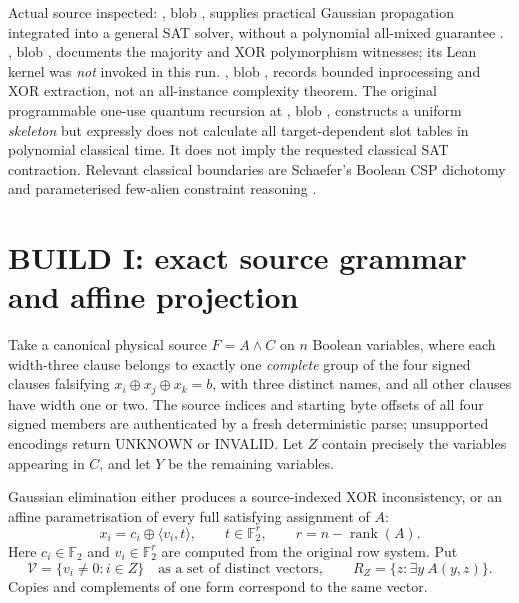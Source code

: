 \documentclass[11pt]{article}
\begin{document}
Actual source inspected:
, blob
\texttt{}, supplies practical
Gaussian propagation integrated into a general SAT solver, without a polynomial
all-mixed guarantee \cite{han2012}.
,
blob \texttt{}, documents the
majority and XOR polymorphism witnesses; its Lean kernel was \emph{not} invoked
in this run. , blob
\texttt{}, records bounded
inprocessing and XOR extraction, not an all-instance complexity theorem.
The original programmable one-use quantum recursion at
,
blob \texttt{}, constructs a
uniform \emph{skeleton} but expressly does not calculate all target-dependent
slot tables in polynomial classical time. It does not imply the requested
classical SAT contraction. Relevant classical boundaries are Schaefer's
Boolean CSP dichotomy \cite{schaefer1978} and parameterised few-alien
constraint reasoning \cite{jonsson2024}.

\section{BUILD I: exact source grammar and affine projection}
Take a canonical physical source $F=A\wedge C$ on $n$ Boolean variables,
where each width-three clause belongs to exactly one \emph{complete} group
of the four signed clauses falsifying $x_i\oplus x_j\oplus x_k=b$,
with three distinct names, and all other clauses have width one or two.
The source indices and starting byte offsets of all four signed members
are authenticated by a fresh deterministic parse; unsupported encodings
return UNKNOWN or INVALID. Let $Z$ contain precisely the variables appearing
in $C$, and let $Y$ be the remaining variables.

Gaussian elimination either produces a source-indexed XOR inconsistency,
or an affine parametrisation of every full satisfying assignment of $A$:
\[
 x_i=c_i\oplus\langle v_i,t\rangle,\qquad
 t\in\mathbb F_2^r,\qquad r=n-\operatorname{rank}(A).
\tag{1}\label{eq:param}
\]
Here $c_i\in\mathbb F_2$ and $v_i\in\mathbb F_2^r$ are computed from the
original row system. Put
\[
 \mathcal V=\{v_i\ne0:i\in Z\}\quad\text{as a set of distinct vectors},
 \qquad R_Z=\{z:\exists y\ A(y,z)\}.
\tag{2}
\]
Copies and complements of one form correspond to the same vector.
\end{document}
